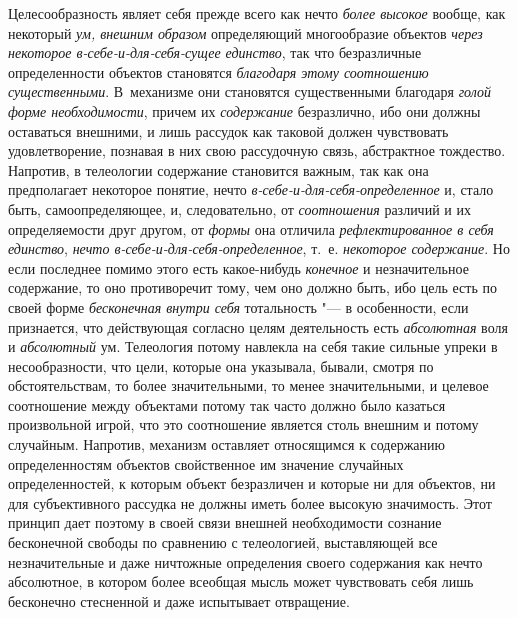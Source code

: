 Целесообразность являет себя прежде всего как нечто
{\em более высокое}
вообще, как некоторый
{\em ум, внешним образом}
определяющий многообразие объектов
{\em через некоторое
в-себе-и-для-себя-сущее единство}, так что безразличные
определенности объектов становятся
{\em благодаря этому соотношению
существенными}. В~механизме они становятся существенными
благодаря {\em голой форме
необходимости}, причем их
{\em содержание}
безразлично, ибо они должны оставаться внешними, и лишь
рассудок как таковой должен чувствовать удовлетворение, познавая в них свою
рассудочную связь, абстрактное тождество. Напротив, в телеологии содержание
становится важным, так как она предполагает некоторое понятие, нечто
{\em в-себе-и-для-себя-определенное}
и, стало быть, самоопределяющее, и, следовательно, от
{\em соотношения}
различий и их определяемости друг другом, от
{\em формы} она отличила
{\em рефлектированное в себя единство},
{\em нечто
в-себе-и-для-себя-определенное}, т.~е.
{\em некоторое содержание}.
Но если последнее помимо этого есть какое-нибудь
{\em конечное} и
незначительное содержание, то оно противоречит тому, чем оно должно быть,
ибо цель есть по своей форме
{\em бесконечная внутри себя}
тотальность "--- в особенности, если признается,
что действующая согласно целям деятельность есть
{\em абсолютная} воля и
{\em абсолютный} ум.
Телеология потому навлекла на себя такие сильные упреки в несообразности,
что цели, которые она указывала, бывали, смотря по обстоятельствам, то
более значительными, то менее значительными, и целевое соотношение между
объектами потому так часто должно было казаться произвольной игрой, что это
соотношение является столь внешним и потому случайным. Напротив, механизм
оставляет относящимся к содержанию определенностям объектов свойственное им
значение случайных определенностей, к которым объект безразличен и которые
ни для объектов, ни для субъективного рассудка не должны
иметь более высокую значимость. Этот принцип дает поэтому в своей связи
внешней необходимости сознание бесконечной свободы по сравнению с
телеологией, выставляющей все незначительные и даже ничтожные определения
своего содержания как нечто абсолютное, в котором более всеобщая мысль
может чувствовать себя лишь бесконечно стесненной и даже испытывает
отвращение.

